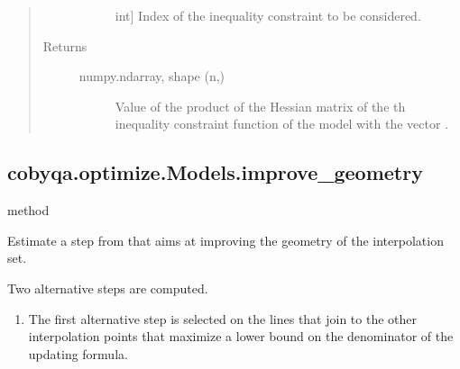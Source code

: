 \documentclass[letterpaper,10pt,english]{sphinxmanual}
\begin{document}
\begin{fulllineitems}
\begin{fulllineitems}
\begin{quote}
\begin{description}
\begin{description}
\item[{}] \leavevmode{[}int{]}
\sphinxAtStartPar
Index of the inequality constraint to be considered.

\end{description}

\item[{Returns}] \leavevmode\begin{description}
\item[{numpy.ndarray, shape (n,)}] \leavevmode
\sphinxAtStartPar
Value of the product of the Hessian matrix of the \sphinxhyphen{}th inequality
constraint function of the model with the vector .

\end{description}

\end{description}\end{quote}

\end{fulllineitems}



\subsection{cobyqa.optimize.Models.improve\_geometry}
\label{\detokenize{refs/generated/cobyqa.optimize.Models.improve_geometry:cobyqa-optimize-models-improve-geometry}}\label{\detokenize{refs/generated/cobyqa.optimize.Models.improve_geometry::doc}}
\sphinxAtStartPar
method

\begin{fulllineitems}
\label{\detokenize{refs/generated/cobyqa.optimize.Models.improve_geometry:cobyqa.optimize.Models.improve_geometry}}
\sphinxAtStartPar
Estimate a step from  that aims at improving the geometry of the
interpolation set.

\sphinxAtStartPar
Two alternative steps are computed.
\begin{enumerate}
%
\item {} 
\sphinxAtStartPar
The first alternative step is selected on the lines that join
 to the other interpolation points that maximize a lower
bound on the denominator of the updating formula.


\end{enumerate}
\end{fulllineitems}
\end{fulllineitems}
\end{document}
